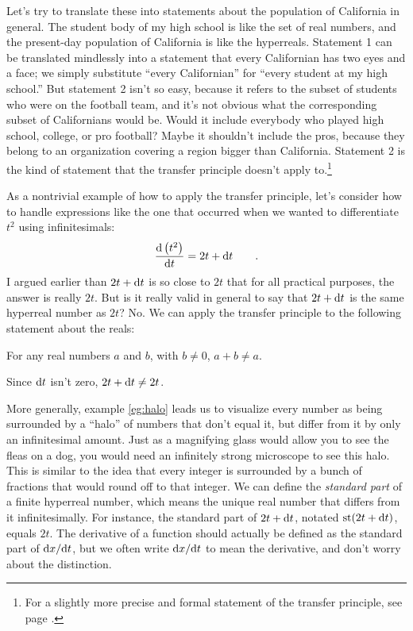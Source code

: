 Let's try to translate these into statements about the population of California in general.
The student body of my high school is like the set of real numbers, and the present-day population
of California is like the hyperreals. Statement 1 can be translated mindlessly into a statement
that every Californian has two eyes and a face; we simply substitute ``every Californian'' for
``every student at my high school.'' But statement 2 isn't so easy, because it refers to the
subset of students who were on the football team, and it's not obvious what the corresponding
subset of Californians would be. Would it include everybody who played high school, college,
or pro football? Maybe it shouldn't include the pros, because they belong to an organization
covering a region bigger than California. Statement 2 is the kind of statement that the
transfer principle doesn't apply to.\footnote{For a slightly more precise and formal statement
of the transfer principle, see page \pageref{transfer}.}\label{backref-transfer}

\begin{eg}\label{eg:halo}
As a nontrivial example of how to apply the transfer principle, let's consider how to handle
expressions like the one that occurred when we wanted to differentiate $t^2$ using infinitesimals:
\begin{equation*}
  \frac{\textup{d} \left(t^2\right)}{\textup{d} t} = 2t+\textup{d} t  \qquad .
\end{equation*}
I argued earlier than $2t+\textup{d} t$ is so close to $2t$ that for all practical purposes, the
answer is really $2t$. But is it really valid in general to say that $2t+\textup{d} t$ is the
same hyperreal number as $2t$? No. We can apply the transfer principle to the
following statement about the reals:

\begin{indentedblock}
For any real numbers $a$ and $b$, with $b\ne 0$, $a+b\ne a$.
\end{indentedblock}

Since $\textup{d} t$ isn't zero, $2t+\textup{d} t\ne 2t$.
\end{eg}

More generally, example \ref{eg:halo} leads us to visualize every number as being surrounded by
a ``halo''
of numbers that don't equal it, but differ from it by only an infinitesimal amount.
Just as a magnifying glass would allow you to see the fleas on a dog, you would need an infinitely
strong microscope to see this halo. This is similar to the idea that every integer is surrounded by a bunch of fractions that
would round off to that integer. We can define the \emph{standard part} of a finite hyperreal
number, which means the unique real number that differs from it infinitesimally. For instance, the
standard part of $2t+\textup{d} t$, notated $\textup{st}(2t+\textup{d} t)$, equals $2t$. The derivative of a function
should actually be defined as the standard part of $\textup{d} x/\textup{d} t$, but we often write $\textup{d} x/\textup{d} t$
to mean the derivative, and don't worry about the distinction.

